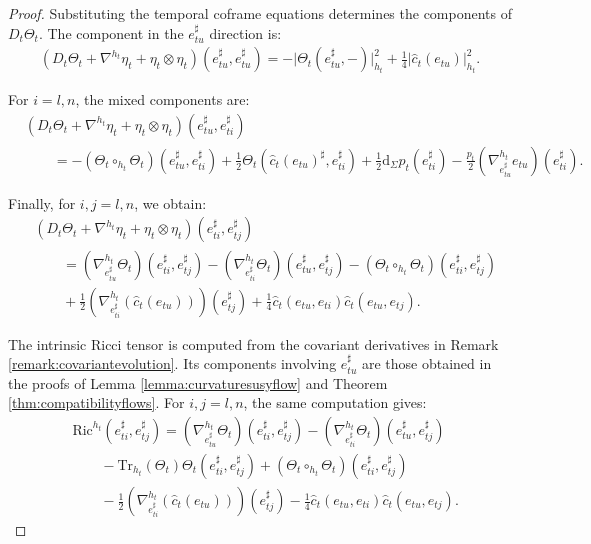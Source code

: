 \documentclass[10pt,reqno,a4paper]{amsart}
\theoremstyle{plain}
\theoremstyle{definition}
\theoremstyle{remark}
\theoremstyle{remark}
\def\dd{\mathrm{d}}
\newcommand{\Tr}{\mathrm{Tr}}
\newcommand{\Ric}{\mathrm{Ric}}
\renewcommand{\(}{ (}
\renewcommand{\)}{ )}
\begin{document}
\begin{proof}
\noindent
Substituting the temporal coframe equations determines the components of $D_t\Theta_t$. The component in the $e^{\sharp}_{tu}$ direction is:
\begin{eqnarray*}
(D_t\Theta_t+\nabla^{h_t}\eta_t + \eta_t\otimes\eta_t) (e^{\sharp}_{tu},e^{\sharp}_{tu}) =-\vert\Theta_t(e^{\sharp}_{tu},-)\vert_{h_t}^2 +\frac{1}{4}\vert\widehat{c}_t(e_{tu})\vert_{h_t}^2.
\end{eqnarray*}

\noindent
For $i=l,n$, the mixed components are:
\begin{eqnarray*}
&  (D_t\Theta_t+\nabla^{h_t}\eta_t
+\eta_t\otimes\eta_t )
(e^{\sharp}_{tu},e^{\sharp}_{ti})\\
& \qquad
=-(\Theta_t\circ_{h_t}\Theta_t)
(e^{\sharp}_{tu},e^{\sharp}_{ti})
+\frac{1}{2}\Theta_t
(\widehat{c}_t(e_{tu})^{\sharp},e^{\sharp}_{ti})
+\frac{1}{2}\dd_{\Sigma}p_t(e^{\sharp}_{ti})
-\frac{p_t}{2}
(\nabla^{h_t}_{e^{\sharp}_{tu}}e_{tu})(e^{\sharp}_{ti}).
\end{eqnarray*}

\noindent
Finally, for $i,j=l,n$, we obtain:
\begin{eqnarray*}
&  (D_t\Theta_t+\nabla^{h_t}\eta_t
+\eta_t\otimes\eta_t )
(e^{\sharp}_{ti},e^{\sharp}_{tj})\\
& \qquad
=(\nabla^{h_t}_{e^{\sharp}_{tu}}\Theta_t)
(e^{\sharp}_{ti},e^{\sharp}_{tj})
-(\nabla^{h_t}_{e^{\sharp}_{ti}}\Theta_t)
(e^{\sharp}_{tu},e^{\sharp}_{tj})
-(\Theta_t\circ_{h_t}\Theta_t)
(e^{\sharp}_{ti},e^{\sharp}_{tj})\\
& \qquad
+\frac{1}{2}
 (\nabla^{h_t}_{e^{\sharp}_{ti}}
(\widehat{c}_t(e_{tu})) )(e^{\sharp}_{tj})
+\frac{1}{4}
\widehat{c}_t(e_{tu},e_{ti})
\widehat{c}_t(e_{tu},e_{tj}).
\end{eqnarray*}

\noindent 
The intrinsic Ricci tensor is computed from the covariant derivatives in Remark \ref{remark:covariantevolution}. Its components involving $e^{\sharp}_{tu}$ are those obtained in the proofs of Lemma \ref{lemma:curvaturesusyflow} and Theorem \ref{thm:compatibilityflows}. For $i,j=l,n$, the same computation gives:
\begin{eqnarray*}
& \Ric^{h_t}(e^{\sharp}_{ti},e^{\sharp}_{tj})
=(\nabla^{h_t}_{e^{\sharp}_{tu}}\Theta_t)
(e^{\sharp}_{ti},e^{\sharp}_{tj})
-(\nabla^{h_t}_{e^{\sharp}_{ti}}\Theta_t)
(e^{\sharp}_{tu},e^{\sharp}_{tj})\\
& \qquad
-\Tr_{h_t}(\Theta_t)\Theta_t
(e^{\sharp}_{ti},e^{\sharp}_{tj})
+(\Theta_t\circ_{h_t}\Theta_t)
(e^{\sharp}_{ti},e^{\sharp}_{tj})\\
& \qquad
-\frac{1}{2}
 (\nabla^{h_t}_{e^{\sharp}_{ti}}
(\widehat{c}_t(e_{tu})) )(e^{\sharp}_{tj})
-\frac{1}{4}
\widehat{c}_t(e_{tu},e_{ti})
\widehat{c}_t(e_{tu},e_{tj}).
\end{eqnarray*}


\end{proof}
\end{document}
